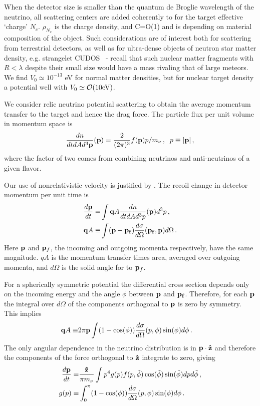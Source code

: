 When the detector size is smaller than the quantum de Broglie wavelength of the neutrino, all scattering centers are added coherently to for the target effective `charge' $N_c$.  $\rho_{N_c}$ is the charge density, and C=O(1) and is depending on material composition of the object. Such considerations are of interest both for scattering from terrestrial detectors, as well as for ultra-dense objects of neutron star matter density, e.g.   strangelet  CUDOS~\cite{Rafelski:2011bby} - recall that such nuclear matter fragments with $R<\lambda$  despite their small size would have a mass rivaling that of large meteors. We find $V_0\simeq 10^{-13}$ eV for normal matter densities, but for nuclear target density a potential well with $V_0\simeq {\cal O}(10 {\rm eV})$.  

We consider relic neutrino potential scattering to obtain the average momentum transfer to the target and hence the drag force. The particle flux per unit volume in momentum space is
\begin{equation}\label{dnQuantum}
\frac{dn}{dtd Ad^3{\bf p}}({\bf p})=\frac{2}{(2\pi)^3}f({\bf p})p/m_\nu\,,\hspace{2mm} p\equiv |{\bf p}|\,,
\end{equation}
where the factor of two comes from combining neutrinos and anti-neutrinos of a given flavor. 

Our use of nonrelativistic velocity is justified by  .  The recoil change in detector momentum per unit time is  
\begin{align}
\frac{d{\bf p}}{dt}=& \int  {\bf q}A \frac{dn}{dtdAd^3p}({\bf p})d^3p\,,\\
{\bf q}A\equiv &\int ({\bf p}-{\bf p_f})\frac{d\sigma}{ d\Omega}({\bf p_f},{\bf p})d\Omega\,.
\end{align}
Here ${\bf p}$ and ${\bf p}_f$, the incoming and outgoing momenta respectively, have the same magnitude. $qA$ is the momentum transfer times area, averaged over outgoing momenta, and $d\Omega$ is the solid angle for to ${\bf p}_f$.  

For a spherically symmetric potential the differential cross section depends only on the incoming energy and the angle $\phi$ between ${\bf p}$ and ${\bf p_f}$.  Therefore, for each ${\bf p}$ the integral over $d\Omega$ of the components orthogonal to ${\bf p}$ is zero by symmetry.  This implies
\begin{align}
{\bf q}A\equiv &2\pi{\bf p}\int(1-\cos(\phi))\frac{d\sigma}{ d\Omega}(p,\phi)\sin(\phi)d\phi\,.
\end{align}
The only angular dependence in the neutrino distribution is in ${\bf p}\cdot {\bf\hat z}$ and therefore the components of the force orthogonal to ${\bf \hat z}$ integrate to zero, giving
\begin{align}\label{drag}
\frac{d{\bf p}}{dt}=&\frac{{\bf\hat z}}{\pi m_\nu } \int p^4g(p) f(p,\tilde\phi) \cos(\tilde\phi) \sin(\tilde\phi) dpd\tilde\phi\,,\\
g(p)\equiv& \int_0^\pi(1-\cos(\phi))\frac{d\sigma}{ d\Omega}(p,\phi)\sin(\phi)d\phi\,.\label{geq}
\end{align}

